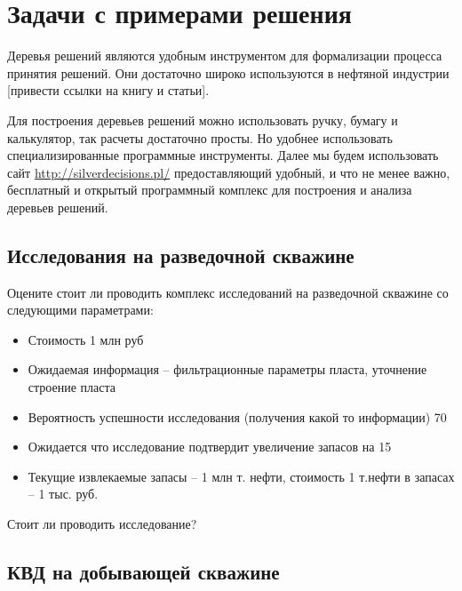 \section{Задачи с примерами решения}

Деревья решений являются удобным инструментом для формализации процесса принятия решений. Они достаточно широко используются в нефтяной индустрии [привести ссылки на книгу и статьи]. 

Для построения деревьев решений можно использовать ручку, бумагу и калькулятор, так расчеты достаточно просты. Но удобнее использовать специализированные программные инструменты. Далее мы будем использовать сайт \url{http://silverdecisions.pl/} предоставляющий удобный, и что не менее важно, бесплатный и открытый программный комплекс для построения и анализа деревьев решений.

\subsection{Исследования на разведочной скважине}
    
    
Оцените стоит ли проводить комплекс исследований на разведочной скважине со следующими параметрами:
\begin{itemize}
    \item Стоимость 1 млн руб
    \item Ожидаемая информация – фильтрационные параметры пласта, уточнение строение пласта
    \item Вероятность успешности исследования (получения какой то информации) 70%
    \item Ожидается что исследование подтвердит увеличение запасов на 15%
    \item Текущие извлекаемые запасы – 1 млн т. нефти, стоимость 1 т.нефти в запасах – 1 тыс. руб.
\end{itemize}     
Стоит ли проводить исследование? 

    
\subsection{КВД на добывающей скважине}

